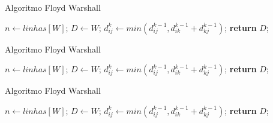 \documentclass[aspectratio=169]{beamer}
\begin{document}
	\begin{frame}{Algoritmo Floyd Warshall}
		\begin{algorithm}[H]
			\caption{Floyd-Warshall}\label{alg:fw}
			\begin{algorithmic}[1]
				\State $n \gets linhas[W]$;
				\State $D\gets W$;
				          
				\State $d^k_{ij} \gets min(d^{k-1}_{ij}, d^{k-1}_{ik} + d^{k-1}_{kj})$; 
				\EndFor
				\EndFor
				\EndFor
				\State \textbf{return} $D$;
				\EndProcedure
			\end{algorithmic}
		\end{algorithm}
	\end{frame}
	
	\begin{frame}{Algoritmo Floyd Warshall}
		\begin{algorithm}[H]
			\caption{Floyd-Warshall}\label{alg:fw}
			\begin{algorithmic}[1]
				\State $n \gets linhas[W]$;
				\State $D\gets W$;
				          
				          
				\State $d^k_{ij} \gets min(d^{k-1}_{ij}, d^{k-1}_{ik} + d^{k-1}_{kj})$; 
				\EndFor
				\EndFor
				\EndFor
				\State \textbf{return} $D$;
				\EndProcedure
			\end{algorithmic}
		\end{algorithm}
	\end{frame}
	
	\begin{frame}{Algoritmo Floyd Warshall}
		\begin{algorithm}[H]
			\caption{Floyd-Warshall}\label{alg:fw}
			\begin{algorithmic}[1]
				\State $n \gets linhas[W]$;
				\State $D\gets W$;
				          
				          
				          
				\State $d^k_{ij} \gets min(d^{k-1}_{ij}, d^{k-1}_{ik} + d^{k-1}_{kj})$; 
				\EndFor
				\EndFor
				\EndFor
				\State \textbf{return} $D$;
				\EndProcedure
			\end{algorithmic}
		\end{algorithm}
	\end{frame}
	
\end{document}
